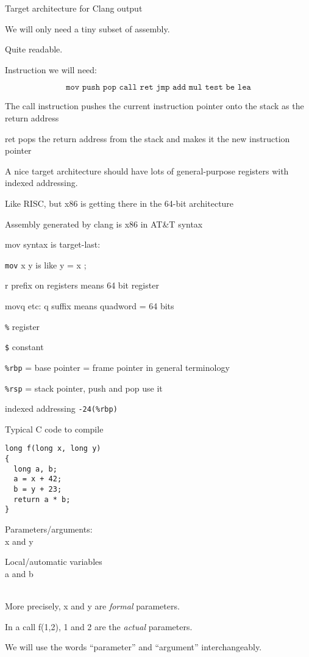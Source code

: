 \documentclass[landscape]{beamer}
\begin{document}
\begin{frame}{Target architecture for Clang output}

We will only need a tiny subset of assembly.

Quite readable.

Instruction we will need:

\[
\texttt{mov push pop call ret jmp add mul test be lea}
\]

The call instruction pushes the current instruction pointer onto the stack as the return address

ret pops the return address from the stack and makes it the new instruction pointer

A nice target architecture should have lots of general-purpose registers with indexed addressing.

Like RISC, but x86 is getting there in the 64-bit architecture

\end{frame}

\begin{frame}{Assembly generated by clang is x86 in AT\&T syntax}

mov syntax is target-last:

\texttt{mov} x y is like y = x ;

r prefix on registers means 64 bit register

movq etc: q suffix means quadword = 64 bits

\texttt{\%} register

\texttt{\$} constant

\texttt{\%rbp} = base pointer = frame pointer in general terminology

\texttt{\%rsp} = stack pointer, push and pop use it

indexed addressing \texttt{-24(\%rbp)}

\end{frame}


\begin{frame}[fragile]{Typical C code to compile}
\begin{minipage}{.5\textwidth}
\begin{verbatim}
long f(long x, long y)
{
  long a, b;
  a = x + 42;
  b = y + 23;
  return a * b;
}
\end{verbatim}
\end{minipage}
%
\begin{minipage}{.4\textwidth}
Parameters/arguments:
\\
 x and y

Local/automatic variables
\\
 a and b 
\end{minipage}
\\[4em]

More precisely, x and y are \emph{formal} parameters.

In a call f(1,2), 1 and 2 are the \emph{actual} parameters.

We will use the words ``parameter'' and ``argument'' interchangeably.

\end{frame}
\end{document}
